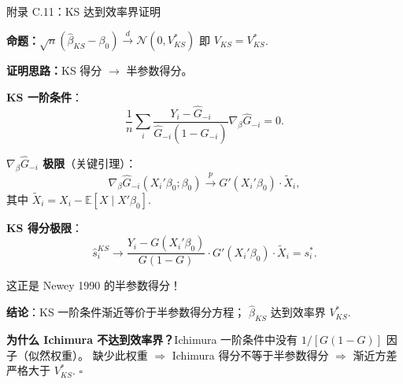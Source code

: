 \documentclass[aspectratio=169, 10pt]{beamer}
\begin{document}
\begin{frame}[shrink=8]{附录 C.11：KS 达到效率界证明}
  \hypertarget{proof-c11}{}

  \textbf{命题：}$\sqrt{n}(\hat\beta_{KS} - \beta_0) \overset{d}{\to} \mathcal{N}(0, V^{*}_{KS})$
  即 $V_{KS} = V^{*}_{KS}$.

  \textbf{证明思路：}KS 得分 $\to$ 半参数得分。

  \textbf{KS 一阶条件}：
  $$\frac{1}{n}\sum_i \frac{Y_i - \hat G_{-i}}{\hat G_{-i}(1-\hat G_{-i})} \nabla_\beta \hat G_{-i} = 0.$$

  \textbf{$\nabla_\beta \hat G_{-i}$ 极限}（关键引理）：
  $$\nabla_\beta \hat G_{-i}(X_i'\beta_0; \beta_0) \overset{p}{\to} G'(X_i'\beta_0) \cdot \tilde X_i,$$
  其中 $\tilde X_i = X_i - \mathbb{E}[X \mid X'\beta_0]$.

  \textbf{KS 得分极限}：
  $$\hat s_i^{KS} \to \frac{Y_i - G(X_i'\beta_0)}{G(1-G)} \cdot G'(X_i'\beta_0) \cdot \tilde X_i = s^{*}_i.$$

  这正是 Newey 1990 的半参数得分！

  \textbf{结论}：KS 一阶条件渐近等价于半参数得分方程；
  $\hat\beta_{KS}$ 达到效率界 $V^{*}_{KS}$.

  \begin{keybox}
    \textbf{为什么 Ichimura 不达到效率界？}Ichimura 一阶条件中没有 $1/[G(1-G)]$ 因子（似然权重）。
    缺少此权重 $\Rightarrow$ Ichimura 得分不等于半参数得分 $\Rightarrow$ 渐近方差严格大于 $V^{*}_{KS}$. $\square$
  \end{keybox}
  \hfill{\scriptsize\hyperlink{main-c11}{}}

\end{frame}
\end{document}
